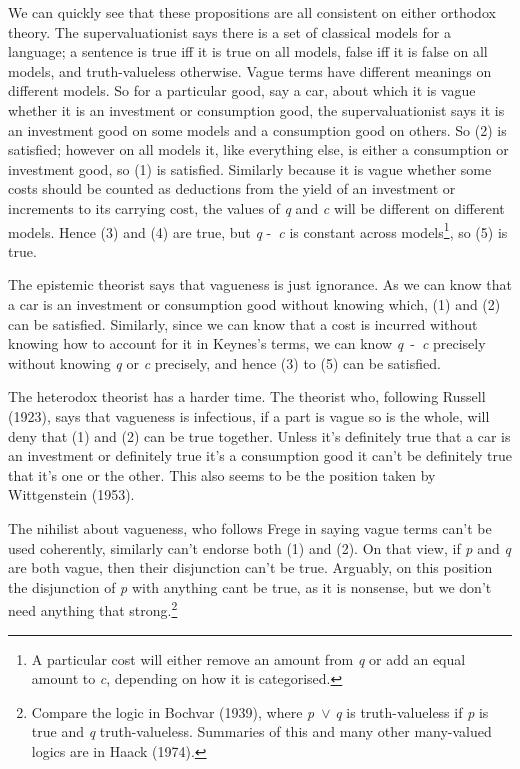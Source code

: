 \documentclass[noflushend]{philosophersimprint}
\begin{document}
We can quickly see that these propositions are all consistent on either
orthodox theory. The supervaluationist says there is a set of classical
models for a language; a sentence is true iff it is true on all models,
false iff it is false on all models, and truth-valueless otherwise.
Vague terms have different meanings on different models. So for a
particular good, say a car, about which it is vague whether it is an
investment or consumption good, the supervaluationist says it is an
investment good on some models and a consumption good on others. So (2)
is satisfied; however on all models it, like everything else, is either
a consumption or investment good, so (1) is satisfied. Similarly because
it is vague whether some costs should be counted as deductions from the
yield of an investment or increments to its carrying cost, the values of
\emph{q} and \emph{c} will be different on different models. Hence (3)
and (4) are true, but \emph{q} -~\emph{c} is constant across
models\footnote{A particular cost will either remove an amount from
  \emph{q} or add an equal amount to \emph{c}, depending on how it is
  categorised.}, so (5) is true.

The epistemic theorist says that vagueness is just ignorance. As we can
know that a car is an investment or consumption good without knowing
which, (1) and (2) can be satisfied. Similarly, since we can know that a
cost is incurred without knowing how to account for it in Keynes's
terms, we can know \emph{q}~-~\emph{c} precisely without knowing
\emph{q} or \emph{c} precisely, and hence (3) to (5) can be satisfied.

The heterodox theorist has a harder time. The theorist who, following
Russell (1923), says that vagueness is infectious, if a part is vague so
is the whole, will deny that (1) and (2) can be true together. Unless
it's definitely true that a car is an investment or definitely true it's
a consumption good it can't be definitely true that it's one or the
other. This also seems to be the position taken by Wittgenstein (1953).

The nihilist about vagueness, who follows Frege in saying vague terms
can't be used coherently, similarly can't endorse both (1) and (2). On
that view, if \emph{p} and \emph{q} are both vague, then their
disjunction can't be true. Arguably, on this position the disjunction of
\emph{p} with anything cant be true, as it is nonsense, but we don't
need anything that strong.\footnote{Compare the logic in Bochvar (1939),
  where \emph{p}~\({\vee}\) \emph{q} is truth-valueless if \emph{p} is
  true and \emph{q} truth-valueless. Summaries of this and many other
  many-valued logics are in Haack (1974).}
\end{document}
